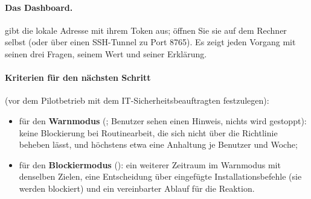 \documentclass[11pt,a4paper]{article}
\begin{document}
\paragraph{Das Dashboard.}  gibt die
lokale Adresse mit ihrem Token aus; öffnen Sie sie auf dem Rechner selbst (oder über einen
SSH-Tunnel zu Port 8765). Es zeigt jeden Vorgang mit seinen drei Fragen, seinem Wert und seiner
Erklärung.

\paragraph{Kriterien für den nächsten Schritt} (vor dem Pilotbetrieb mit dem
IT-Sicherheitsbeauftragten festzulegen):
\begin{itemize}
  \item für den \textbf{Warnmodus} (; Benutzer sehen einen Hinweis, nichts wird
    gestoppt): keine Blockierung bei Routinearbeit, die sich nicht über die Richtlinie beheben
    lässt, und höchstens etwa eine Anhaltung je Benutzer und Woche;
  \item für den \textbf{Blockiermodus} (): ein weiterer Zeitraum im Warnmodus mit
    denselben Zielen, eine Entscheidung über eingefügte Installationsbefehle (sie werden
    blockiert) und ein vereinbarter Ablauf für die Reaktion.
\end{itemize}

\end{document}
